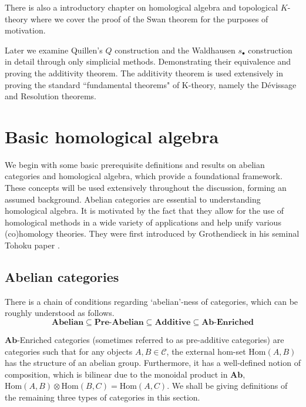 \documentclass[12pt]{report}
\makeatletter
\numberwithin{equation}{section}
\newcommand{\Hom}{{\mathrm{Hom}}}
\newcommand\mainmatter{%
	\cleardoublepage
	 \@mainmattertrue
	\pagenumbering{arabic}}
\makeatother
\begin{document}
	There is also a introductory chapter on homological algebra and topological \( K \)-theory where we cover the proof of the Swan theorem for the purposes of motivation.
	
	Later we examine Quillen's \( Q \) construction and the Waldhausen \( s_\bullet \) construction in detail through only simplicial methods. Demonstrating their equivalence and proving the additivity theorem. The additivity theorem is used extensively in proving the standard ``fundamental theorems" of K-theory, namely the D\'evissage and Resolution theorems. 
\clearpage
	\tableofcontents
	\mainmatter
	\chapter{Basic homological algebra}
	We begin with some basic prerequisite definitions and results on abelian categories and homological algebra, which provide a foundational framework. These concepts will be used extensively throughout the discussion, forming an assumed background.
	Abelian categories are essential to understanding homological algebra. It is motivated by the fact that they allow for the use of homological methods in a wide variety of applications and help unify various (co)homology theories. They were first introduced by Grothendieck in his seminal Tohoku paper \cite{grothendieck1957quelques}.
	
	\section{Abelian categories}
	There is a chain of conditions regarding `abelian'-ness of categories, which can be roughly understood as follows.
	\[ \textbf{Abelian} \subseteq \textbf{Pre-Abelian} \subseteq \textbf{Additive} \subseteq \textbf{Ab-Enriched}\]
	
	$\mathbf{Ab}$-Enriched categories  (sometimes referred to as pre-additive categories) are categories such that for any objects $A,B \in \mathcal{C}$, the external hom-set $\Hom(A,B)$ has the structure of an abelian group. Furthermore, it has a well-defined notion of composition, which is bilinear due to the monoidal product in $\mathbf{Ab}$, $\Hom(A,B)\otimes \Hom(B,C) =\Hom(A,C)$. We shall be giving definitions of the remaining three types of categories in this section.
	
\end{document}

